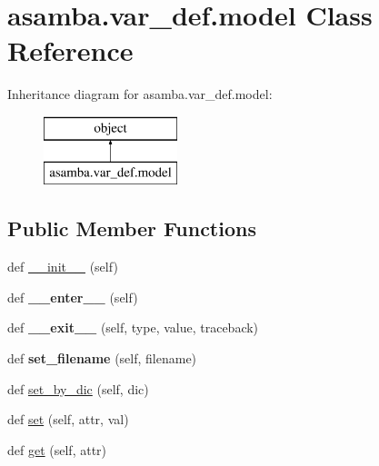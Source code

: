 \hypertarget{classasamba_1_1var__def_1_1model}{}\section{asamba.\+var\+\_\+def.\+model Class Reference}
\label{classasamba_1_1var__def_1_1model}
Inheritance diagram for asamba.\+var\+\_\+def.\+model\+:\begin{figure}[H]
\begin{center}
\leavevmode
\includegraphics[height=2.000000cm]{classasamba_1_1var__def_1_1model}
\end{center}
\end{figure}
\subsection*{Public Member Functions}
\begin{DoxyCompactItemize}
\item 
def \hyperlink{classasamba_1_1var__def_1_1model_a6bb4340f0dd97b1311eb7b3e053de0c7}{\+\_\+\+\_\+init\+\_\+\+\_\+} (self)
\item 
\mbox{\label{classasamba_1_1var__def_1_1model_a6a49d75a9ee4d9eed26b01023eff743f}} 
def {\bfseries \+\_\+\+\_\+enter\+\_\+\+\_\+} (self)
\item 
\mbox{\label{classasamba_1_1var__def_1_1model_ab85d274fc5f0d3c17ee11b4d0e5fa739}} 
def {\bfseries \+\_\+\+\_\+exit\+\_\+\+\_\+} (self, type, value, traceback)
\item 
\mbox{\label{classasamba_1_1var__def_1_1model_a843e0624678507d02e9c8e6656563440}} 
def {\bfseries set\+\_\+filename} (self, filename)
\item 
def \hyperlink{classasamba_1_1var__def_1_1model_a49205357c320bfe944bc1177b3d3a4ee}{set\+\_\+by\+\_\+dic} (self, dic)
\item 
def \hyperlink{classasamba_1_1var__def_1_1model_adf918a64e584736b39e108f4c705d413}{set} (self, attr, val)
\item 
def \hyperlink{classasamba_1_1var__def_1_1model_abc39be012825aa3842b694adc8a3b697}{get} (self, attr)
\end{DoxyCompactItemize}
